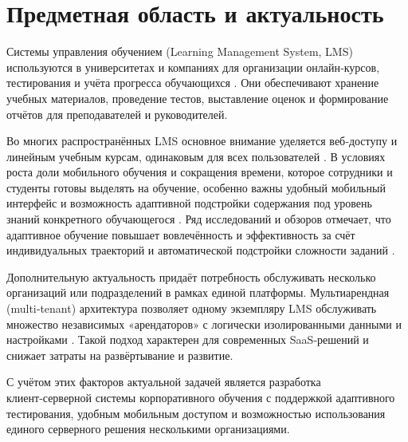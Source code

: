 \documentclass{G7-32}
\begin{document}

\newpage

\tableofcontents
\newpage

\makeatletter
\renewcommand{\thesection}{\arabic{section}}
\renewcommand{\@seccntformat}[1]{\csname the#1\endcsname\quad}
\makeatother

\setcounter{section}{0}

\section{Предметная область и актуальность}

Системы управления обучением (Learning Management System, LMS) используются в университетах и компаниях для организации онлайн‑курсов, тестирования и учёта прогресса обучающихся \cite{moodle,openlms}. Они обеспечивают хранение учебных материалов, проведение тестов, выставление оценок и формирование отчётов для преподавателей и руководителей.

Во многих распространённых LMS основное внимание уделяется веб‑доступу и линейным учебным курсам, одинаковым для всех пользователей \cite{moodlecloud}. В условиях роста доли мобильного обучения и сокращения времени, которое сотрудники и студенты готовы выделять на обучение, особенно важны удобный мобильный интерфейс и возможность адаптивной подстройки содержания под уровень знаний конкретного обучающегося \cite{mobile-learning-trends,mobile-lms-features}. Ряд исследований и обзоров отмечает, что адаптивное обучение повышает вовлечённость и эффективность за счёт индивидуальных траекторий и автоматической подстройки сложности заданий \cite{docebo-adaptive,adaptive-edu,intelligent-adaptive}.

Дополнительную актуальность придаёт потребность обслуживать несколько организаций или подразделений в рамках единой платформы. Мультиарендная (multi‑tenant) архитектура позволяет одному экземпляру LMS обслуживать множество независимых «арендаторов» с логически изолированными данными и настройками \cite{multi-tenant-guide,proprofsmultitenant,multitenant-moodle}. Такой подход характерен для современных SaaS‑решений и снижает затраты на развёртывание и развитие.

С учётом этих факторов актуальной задачей является разработка клиент‑серверной системы корпоративного обучения с поддержкой адаптивного тестирования, удобным мобильным доступом и возможностью использования единого серверного решения несколькими организациями.
\end{document}
